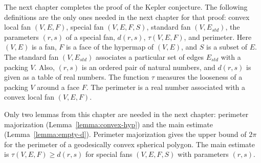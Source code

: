The next chapter  completes the proof of the Kepler conjecture.
The following definitions are the only ones needed in the next chapter
for that proof: convex local fan $(V,E,F)$, special fan $(V,E,F,S)$,
standard fan $(V,E_{std})$, the parameters $(r,s)$ of a special fan,
$d(r,s)$, $\tau(V,E,F)$, and perimeter.  Here $(V,E)$ is a fan, $F$ is
a face of the hypermap of $(V,E)$, and $S$ is a subset of $E$.  The
standard fan $(V,E_{std})$ associates a particular set of edges
$E_{std}$ with a packing $V$.  Also, $(r,s)$ is an ordered pair of
natural numbers, and $d(r,s)$ is given as a table of real numbers.
The function $\tau$ measures the looseness of a packing $V$ around a
face $F$.  The perimeter is a real number associated with a convex
local fan $(V,E,F)$.

Only two lemmas from this chapter are needed in the next chapter:
perimeter majorization (Lemma~\ref{lemma:convex-hyp}) and the main
estimate (Lemma~\ref{lemma:empty-d}).  Perimeter majorization gives
the upper bound of $2\pi$ for the perimeter of a geodesically convex
spherical polygon.  The main estimate is $\tau(V,E,F)\ge d(r,s)$ for
special fans $(V,E,F,S)$ with parameters $(r,s)$.
